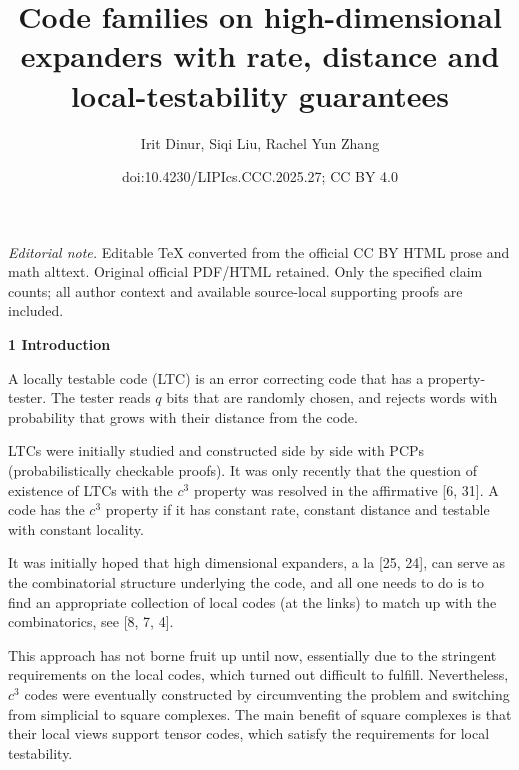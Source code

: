 \documentclass[10pt,a4paper]{article}
\title{Code families on high-dimensional expanders with rate, distance and local-testability guarantees}
\author{Irit Dinur, Siqi Liu, Rachel Yun Zhang}
\date{doi:10.4230/LIPIcs.CCC.2025.27; CC BY 4.0}
\begin{document}
\maketitle
\noindent\textit{Editorial note.} Editable TeX converted from the official CC BY HTML prose and math alttext. Original official PDF/HTML retained. Only the specified claim counts; all author context and available source-local supporting proofs are included.\par\medskip


\par\medskip\noindent\textbf{
1 Introduction}\par




A locally testable code (LTC) is an error correcting code that has a property-tester. The tester reads $q$ bits that are randomly chosen, and rejects words with probability that grows with their distance from the code.\par




LTCs were initially studied and constructed side by side with PCPs (probabilistically checkable proofs). It was only recently that the question of existence of LTCs with the $c^{3}$ property was resolved in the affirmative [6, 31]. A code has the $c^{3}$ property if it has constant rate, constant distance and testable with constant locality.\par




It was initially hoped that high dimensional expanders, a la [25, 24], can serve as the combinatorial structure underlying the code, and all one needs to do is to find an appropriate collection of local codes (at the links) to match up with the combinatorics, see [8, 7, 4].\par




This approach has not borne fruit up until now, essentially due to the stringent requirements on the local codes, which turned out difficult to fulfill. Nevertheless, $c^{3}$ codes were eventually constructed by circumventing the problem and switching from simplicial to square complexes. The main benefit of square complexes is that their local views support tensor codes, which satisfy the requirements for local testability.\par
\end{document}
